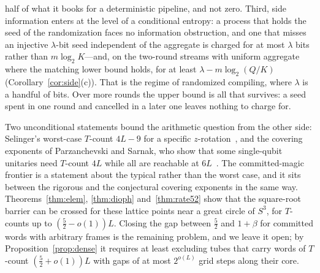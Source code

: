 \documentclass[aps,prx,twocolumn,superscriptaddress,nofootinbib,longbibliography]{revtex4-2}
\theoremstyle{plain}
\theoremstyle{definition}
\theoremstyle{remark}
\begin{document}
half of what it books for a deterministic pipeline, and not zero. Third, side information enters at the level of a conditional entropy: a process that holds the seed of the randomization faces no information obstruction, and one that misses an injective $\lambda$-bit seed independent of the aggregate is charged for at most $\lambda$ bits rather than $m\log_2K$---and, on the two-round streams with uniform aggregate where the matching lower bound holds, for at least $\lambda-m\log_2(Q/K)$ (Corollary~\ref{cor:side}(c)). That is the regime of randomized compiling, where $\lambda$ is a handful of bits. Over more rounds the upper bound is all that survives: a seed spent in one round and cancelled in a later one leaves nothing to charge for.

Two unconditional statements bound the arithmetic question from the other side: Selinger's worst-case $T$-count $4L-9$ for a specific $z$-rotation~\cite[Thm.~30]{Selinger15}, and the covering exponents of Parzanchevski and Sarnak, who show that some single-qubit unitaries need $T$-count $4L$ while all are reachable at $6L$~\cite{PS18}. The committed-magic frontier is a statement about the typical rather than the worst case, and it sits between the rigorous and the conjectural covering exponents in the same way. Theorems~\ref{thm:elem}, \ref{thm:dioph} and~\ref{thm:rate52} show that the square-root barrier can be crossed for these lattice points near a great circle of $S^3$, for $T$-counts up to $(\tfrac52-o(1))L$. Closing the gap between $\tfrac52$ and $1+\beta$ for committed words with arbitrary frames is the remaining problem, and we leave it open; by Proposition~\ref{prop:dense} it requires at least excluding tubes that carry words of $T$-count $(\tfrac52+o(1))L$ with gaps of at most $2^{o(L)}$ grid steps along their core.
\end{document}

